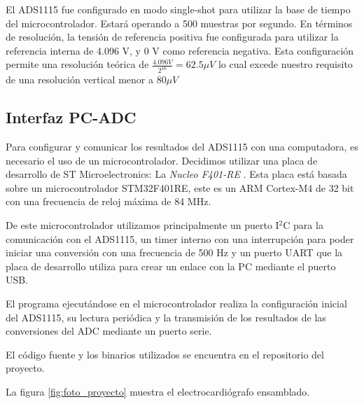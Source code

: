\documentclass[conference]{IEEEtran}
\begin{document}
El ADS1115 fue configurado en modo single-shot para utilizar la base de tiempo
del microcontrolador. Estará operando a 500 muestras por segundo. En términos de
resolución, la tensión de referencia positiva fue configurada para utilizar la
referencia interna de 4.096 V, y 0 V como referencia negativa. Esta
configuración permite una resolución teórica de $\frac{4.096 V}{2^{16}} = 
62.5 \mu V$ lo cual excede nuestro requisito de una resolución vertical menor
a $80 \mu V$

\subsection{Interfaz PC-ADC}

Para configurar y comunicar los resultados del ADS1115 con una computadora, es
necesario el uso de un microcontrolador. Decidimos utilizar una placa de
desarrollo de ST Microelectronics: La \textit{Nucleo F401-RE} \cite{nucleo}.
Esta placa está basada sobre un microcontrolador STM32F401RE, este es un ARM
Cortex-M4 de 32 bit con una frecuencia de reloj máxima de 84 MHz. 

De este microcontrolador utilizamos principalmente un puerto I$^2$C para la
comunicación con el ADS1115, un timer interno con una interrupción para poder
iniciar una conversión con una frecuencia de 500 Hz y un puerto UART que la
placa de desarrollo utiliza para crear un enlace con la PC mediante el
puerto USB.

El programa ejecutándose en el microcontrolador realiza la configuración inicial
del ADS1115, su lectura periódica y la transmisión de los resultados de las
conversiones del ADC mediante un puerto serie.

El código fuente y los binarios utilizados se encuentra en el repositorio del
proyecto. \cite{repository} 

La figura \ref{fig:foto_proyecto} muestra el electrocardiógrafo ensamblado.
\end{document}
